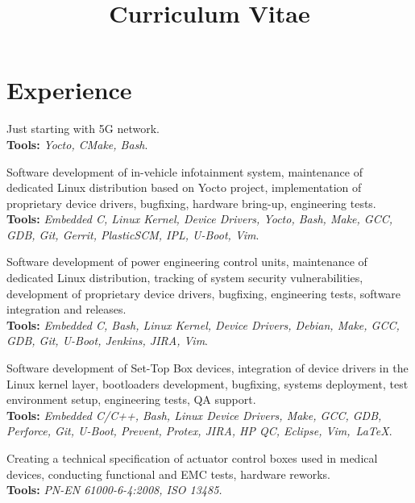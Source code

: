 \documentclass[11pt,a4paper,sans]{moderncv} %
\title{Curriculum Vitae}
\begin{document}
\makecvtitle %


\section{Experience}

{Just starting with 5G network.\\ \textbf{Tools:}  \textit{Yocto, CMake, Bash}.}

{Software development of in-vehicle infotainment system, maintenance of dedicated Linux distribution
based on Yocto project, implementation of proprietary device drivers, bugfixing, hardware bring-up,
engineering tests.\\ \textbf{Tools:} \textit{Embedded C, Linux Kernel, Device Drivers, Yocto, Bash,
Make, GCC, GDB, Git, Gerrit, PlasticSCM, IPL, U-Boot, Vim}.}


{Software development of power engineering control units, maintenance of dedicated Linux distribution,
tracking of system security vulnerabilities, development of proprietary device drivers, bugfixing,
engineering tests, software integration and releases. \\ \textbf{Tools:} \textit{Embedded C, Bash,
Linux Kernel, Device Drivers, Debian, Make, GCC, GDB, Git, U-Boot, Jenkins, JIRA, Vim}.}


{Software development of Set-Top Box devices, integration of device drivers in the Linux kernel layer,
bootloaders development, bugfixing, systems deployment, test environment setup, engineering tests,
QA support. \\ \textbf{Tools:} \textit{Embedded C/C++, Bash, Linux Device Drivers, Make, GCC, GDB,
Perforce, Git, U-Boot, Prevent, Protex, JIRA, HP QC, Eclipse, Vim,~\LaTeX}.}

{Creating a technical specification of actuator control boxes used in medical devices, conducting functional
and EMC tests, hardware reworks. \\ \textbf{Tools:} \textit{PN-EN 61000-6-4:2008, ISO 13485.}}
\end{document}
